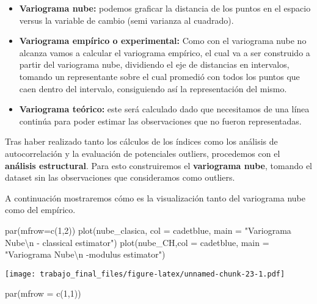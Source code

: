 \documentclass[
  12pt,
]{article}
\newenvironment{Shaded}{\begin{snugshade}}{\end{snugshade}}
\newcommand{\AttributeTok}[1]{\textcolor[rgb]{0.77,0.63,0.00}{#1}}
\newcommand{\DecValTok}[1]{\textcolor[rgb]{0.00,0.00,0.81}{#1}}
\newcommand{\FunctionTok}[1]{\textcolor[rgb]{0.00,0.00,0.00}{#1}}
\newcommand{\NormalTok}[1]{#1}
\newcommand{\SpecialCharTok}[1]{\textcolor[rgb]{0.00,0.00,0.00}{#1}}
\newcommand{\StringTok}[1]{\textcolor[rgb]{0.31,0.60,0.02}{#1}}
\begin{document}
\begin{itemize}
\item
  \textbf{Variograma nube:} podemos graficar la distancia de los puntos
  en el espacio versus la variable de cambio (semi varianza al
  cuadrado).
\item
  \textbf{Variograma empírico o experimental:} Como con el variograma
  nube no alcanza vamos a calcular el variograma empírico, el cual va a
  ser construido a partir del variograma nube, dividiendo el eje de
  distancias en intervalos, tomando un representante sobre el cual
  promedió con todos los puntos que caen dentro del intervalo,
  consiguiendo así la representación del mismo.
\item
  \textbf{Variograma teórico:} este será calculado dado que necesitamos
  de una línea continúa para poder estimar las observaciones que no
  fueron representadas.
\end{itemize}

Tras haber realizado tanto los cálculos de los índices como los análisis
de autocorrelación y la evaluación de potenciales outliers, procedemos
con el \textbf{análisis estructural}. Para esto construiremos el
\textbf{variograma nube}, tomando el dataset sin las observaciones que
consideramos como outliers.

A continuación mostraremos cómo es la visualización tanto del variograma
nube como del empírico.

\begin{Shaded}
\begin{Highlighting}[]
\FunctionTok{par}\NormalTok{(}\AttributeTok{mfrow=}\FunctionTok{c}\NormalTok{(}\DecValTok{1}\NormalTok{,}\DecValTok{2}\NormalTok{))}
\FunctionTok{plot}\NormalTok{(nube\_clasica, }\AttributeTok{col =} \StringTok{\textquotesingle{}cadetblue\textquotesingle{}}\NormalTok{, }\AttributeTok{main =} \StringTok{"Variograma Nube}\SpecialCharTok{\textbackslash{}n}\StringTok{ {-} classical estimator"}\NormalTok{)}
\FunctionTok{plot}\NormalTok{(nube\_CH,}\AttributeTok{col =} \StringTok{\textquotesingle{}cadetblue\textquotesingle{}}\NormalTok{,  }\AttributeTok{main =} \StringTok{"Variograma Nube}\SpecialCharTok{\textbackslash{}n}\StringTok{ {-}modulus estimator"}\NormalTok{)}
\end{Highlighting}
\end{Shaded}

\texttt{[image: trabajo\_final\_files/figure-latex/unnamed-chunk-23-1.pdf]}

\begin{Shaded}
\begin{Highlighting}[]
\FunctionTok{par}\NormalTok{(}\AttributeTok{mfrow =} \FunctionTok{c}\NormalTok{(}\DecValTok{1}\NormalTok{,}\DecValTok{1}\NormalTok{))}
\end{Highlighting}
\end{Shaded}
\end{document}
